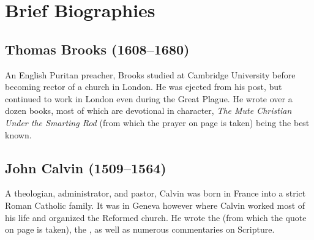 

\chapter{Brief Biographies}

\section{Thomas Brooks (1608--1680)}\label{brooks}

An English Puritan preacher, Brooks studied at Cambridge University before becoming rector of a church in London. He was ejected from his post, but continued to work in London even during the Great Plague. He wrote over a dozen books, most of which are devotional in character, {\em The Mute Christian Under the Smarting Rod} (from which the prayer on page \pageref{q1prayer} is taken) being the best known.

\section{John Calvin (1509--1564)}\label{calvin}

A theologian, administrator, and pastor, Calvin was born in France into a strict Roman Catholic family. It was in Geneva however where Calvin worked most of his life and organized the Reformed church. He wrote the  (from which the quote on page \pageref{q1comment} is taken), the , as well as numerous commentaries on Scripture.

